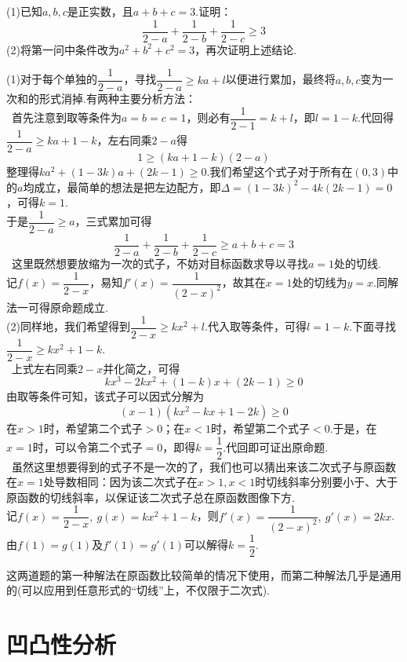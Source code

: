 \documentclass[cn,hazy,black,10pt,normal]{elegantnote}
\newcommand{\sw}[1]{\boxed{\text{解法 #1}} \ }
\begin{document}
\begin{instance}
	(1)已知$a,b,c$是正实数，且$a+b+c=3$.证明：$$\frac{1}{2-a}+\frac{1}{2-b}+\frac{1}{2-c} \geq 3$$
	(2)将第一问中条件改为$a^2+b^2+c^2=3$，再次证明上述结论.
\end{instance}
\begin{solution}
	(1)对于每个单独的$\dfrac{1}{2-a}$，寻找$\dfrac{1}{2-a} \geq ka+l$以便进行累加，最终将$a,b,c$变为一次和的形式消掉.有两种主要分析方法： \\
	\sw{一}首先注意到取等条件为$a=b=c=1$，则必有$\dfrac{1}{2-1}=k+l$，即$l=1-k$.代回得$\dfrac{1}{2-a} \geq ka+1-k$，左右同乘$2-a$得$$1 \geq (ka+1-k)(2-a)$$
	整理得$ka^2+(1-3k)a+(2k-1) \geq 0$.我们希望这个式子对于所有在$(0,3)$中的$a$均成立，最简单的想法是把左边配方，即$\Delta = (1-3k)^2-4k(2k-1) = 0$，可得$k=1$. \\
	于是$\dfrac{1}{2-a} \geq a$，三式累加可得$$\frac{1}{2-a}+\frac{1}{2-b}+\frac{1}{2-c} \geq a+b+c = 3$$
	\sw{二}这里既然想要放缩为一次的式子，不妨对目标函数求导以寻找$a=1$处的切线. \\
	记$f(x)=\dfrac{1}{2-x}$，易知$f'(x) = \dfrac{1}{(2-x)^2}$，故其在$x=1$处的切线为$y=x$.同解法一可得原命题成立. \\
	(2)同样地，我们希望得到$\dfrac{1}{2-x} \geq kx^2+l$.代入取等条件，可得$l=1-k$.下面寻找$\dfrac{1}{2-x} \geq kx^2+1-k$. \\
	\sw{一}上式左右同乘$2-x$并化简之，可得$$kx^3-2kx^2+(1-k)x+(2k-1) \geq 0$$
	由取等条件可知，该式子可以因式分解为$$(x-1)(kx^2-kx+1-2k) \geq 0$$
	在$x > 1$时，希望第二个式子$>0$；在$x<1$时，希望第二个式子$<0$.于是，在$x=1$时，可以令第二个式子$=0$，即得$k=\dfrac{1}{2}$.代回即可证出原命题. \\
	\sw{二}虽然这里想要得到的式子不是一次的了，我们也可以猜出来该二次式子与原函数在$x=1$处导数相同：因为该二次式子在$x>1,x<1$时切线斜率分别要小于、大于原函数的切线斜率，以保证该二次式子总在原函数图像下方. \\
	记$f(x)=\dfrac{1}{2-x},~g(x)=kx^2+1-k$，则$f'(x)=\dfrac{1}{(2-x)^2},~g'(x)=2kx$.由$f(1)=g(1)$及$f'(1)=g'(1)$可以解得$k=\dfrac{1}{2}$.
\end{solution}
\begin{remark}
	这两道题的第一种解法在原函数比较简单的情况下使用，而第二种解法几乎是通用的(可以应用到任意形式的“切线”上，不仅限于二次式).
\end{remark}

\section{凹凸性分析}
\end{document}
